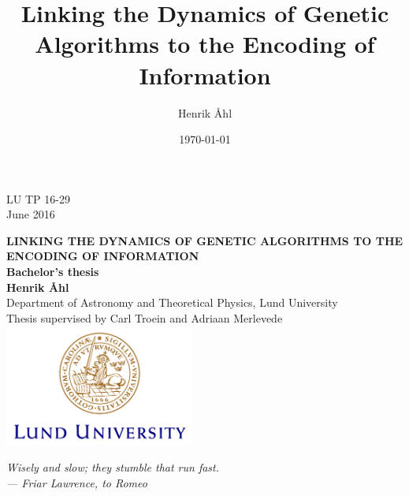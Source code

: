 \documentclass[a4paper,12pt]{article}
\title
{
	\textbf
	{
      Linking the Dynamics of Genetic Algorithms to the Encoding of Information
   }\\[1em]
}
\author{Henrik Åhl}
\date{\today}
\theoremstyle{plain}
\theoremstyle{definition}
\begin{document}
\begin{titlepage}
   \begin{flushright}
   LU TP 16-29\\
   June 2016\\
   \end{flushright}
   \vfill
   
   \begin{center}
      {\large\bf LINKING THE DYNAMICS OF GENETIC ALGORITHMS TO THE ENCODING OF
      INFORMATION\\[3mm]
      Bachelor's thesis}
      \\[3cm]
      {\bf Henrik Åhl}
      \\[5mm]
		{Department of Astronomy and Theoretical Physics, Lund University}
		\\[2cm]
		{Thesis supervised by Carl Troein and Adriaan Merlevede}
		\vfill
		\includegraphics[height=4cm]{logocLUeng.pdf}
	\end{center}
	\thispagestyle{empty} %
\end{titlepage}
   \pagebreak
   \thispagestyle{empty} %
   \phantom{p\\[5cm]}
   \vfill
\begin{otherlanguage}{swedish}
   \noindent\textit{Wisely and slow; they stumble that run fast.\\[1em]
--- Friar Lawrence, to Romeo}
\end{otherlanguage}
\vfill
   \pagebreak
   \phantom{p}
\end{document}
